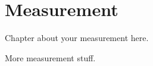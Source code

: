 \chapter{Measurement} \label{ch:meas}
\thispagestyle{plainbottom}
Chapter about your measurement here.

\clearpage
More measurement stuff.
